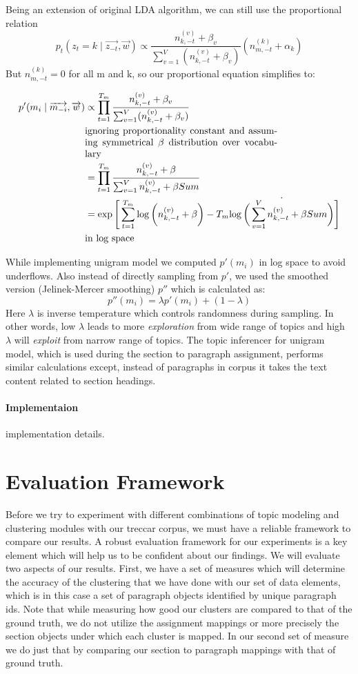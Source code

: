 Being an extension of original LDA algorithm, we can still use the proportional relation
$$ p_t(z_t = k \mid \overrightarrow{z_{-t}}, \overrightarrow{w}) \propto 
   \frac{n_{k,-t}^{(v)}+\beta_v}{\sum_{v=1}^V (n_{k,-t}^{(v)}+\beta_v)}(n_{m,-t}^{(k)}+\alpha_k)
$$
But $ n_{m,-t}^{(k)} = 0$ for all m and k, so our proportional equation simplifies to:

\begin{align*}
p'(m_i \mid \overrightarrow{m_{-i}}, \overrightarrow{w}) & \propto
   \prod_{t=1}^{T_m} \frac{n_{k,-t}^{(v)}+\beta_v}{\sum_{v=1}^V (n_{k,-t}^{(v)}+\beta_v)} \\
   & \parbox{20em}{ignoring proportionality constant and assuming symmetrical $ \beta$ distribution over vocabulary} \\
   &= \prod_{t=1}^{T_m} \frac{n_{k,-t}^{(v)}+\beta}{\sum_{v=1}^V n_{k,-t}^{(v)}+\beta Sum}  \\
   &= \exp \Bigg[ \sum_{t=1}^{T_m} \log \bigg( n_{k,-t}^{(v)}+\beta \bigg)-T_m \dot{\log \bigg( \sum_{v=1}^V n_{k,-t}^{(v)}+\beta Sum \bigg)} \Bigg] \\
   & \text{in log space}
\end{align*}

While implementing unigram model we computed $ p'(m_i)$ in log space to avoid underflows. Also instead of directly sampling from $ p'$, we used the smoothed version (Jelinek-Mercer smoothing) $ p''$ which is calculated as:
$$ p''(m_i) = \lambda p'(m_i) + (1- \lambda) $$
Here $ \lambda$ is inverse temperature which controls randomness during sampling. In other words, low $ \lambda$ leads to more \textit{exploration} from wide range of topics and high $ \lambda$ will \textit{exploit} from narrow range of topics. The topic inferencer for unigram model, which is used during the section to paragraph assignment, performs similar calculations except, instead of paragraphs in corpus it takes the text content related to section headings.
\paragraph{Implementaion} implementation details.
\section{Evaluation Framework}
\label{sec:3}
Before we try to experiment with different combinations of topic modeling and clustering modules with our treccar corpus, we must have a reliable framework to compare our results. A robust evaluation framework for our experiments is a key element which will help us to be confident about our findings. We will evaluate two aspects of our results. First, we have a set of measures which will determine the accuracy of the clustering that we have done with our set of data elements, which is in this case a set of paragraph objects identified by unique paragraph ids. Note that while measuring how good our clusters are compared to that of the ground truth, we do not utilize the assignment mappings or more precisely the section objects under which each cluster is mapped. In our second set of measure we do just that by comparing our section to paragraph mappings with that of ground truth. 
